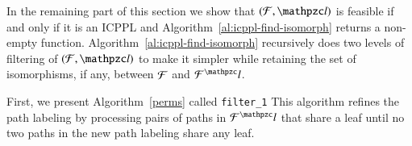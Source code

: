 \documentclass[MS,]{iitmdiss}
\begin{document}
In the remaining part of this section we show that $(\cF, \cl)$ is
feasible if and only if it is an ICPPL and
Algorithm~\ref{al:icppl-find-isomorph} returns a non-empty
function. Algorithm~\ref{al:icppl-find-isomorph} recursively does two
levels of filtering of $(\cF, \cl)$ to make it simpler while retaining
the set of isomorphisms, if any, between ${\cal F}$ and $\cF^\cl$.

First, we present Algorithm~\ref{perms} called {\tt filter\_1}
This algorithm refines the path labeling by
processing pairs of paths in $\cF^\cl$ that share a leaf until no two
paths in the new path labeling share any leaf.
\end{document}
